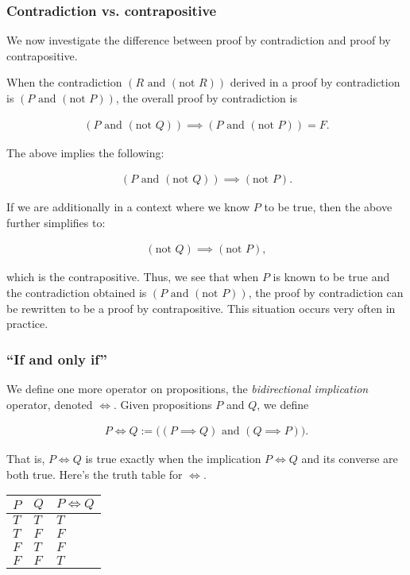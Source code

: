 \subsubsection*{Contradiction vs. contrapositive}

We now investigate the difference between proof by contradiction and proof by contrapositive. 

When the contradiction $(R \text{ and } (\text{not } R))$ derived in a proof by contradiction is $(P \text{ and } (\text{not } P))$, the overall proof by contradiction is

\begin{align*}
    (P \text{ and } (\text{not } Q)) \implies (P \text{ and } (\text{not } P)) = F.
\end{align*}

The above implies the following:

\begin{align*}
    (P \text{ and } (\text{not } Q)) \implies (\text{not } P).
\end{align*}

If we are additionally in a context where we know $P$ to be true, then the above further simplifies to:

\begin{align*}
    (\text{not } Q) \implies (\text{not } P),
\end{align*}

which is the contrapositive. Thus, we see that when $P$ is known to be true and the contradiction obtained is $(P \text{ and } (\text{not } P))$, the proof by contradiction can be rewritten to be a proof by contrapositive. This situation occurs very often in practice.

\subsubsection*{``If and only if''}

We define one more operator on propositions, the \textit{bidirectional implication} operator, denoted $\iff$. Given propositions $P$ and $Q$, we define

\begin{align*}
    P \iff Q := \Big( (P \implies Q) \text{ and } (Q \implies P) \Big).
\end{align*}

That is, $P \iff Q$ is true exactly when the implication $P \iff Q$ and its converse are both true. Here's the truth table for $\iff$.

\begin{table}[H]
    \centering
    \begin{tabular}{|l|l|l|}
    \hline
    $P$ & $Q$ & $P \iff Q$ \\ \hline
    $T$ & $T$ & $T$        \\ \hline
    $T$ & $F$ & $F$        \\ \hline
    $F$ & $T$ & $F$        \\ \hline
    $F$ & $F$ & $T$        \\ \hline
    \end{tabular}
\end{table}

